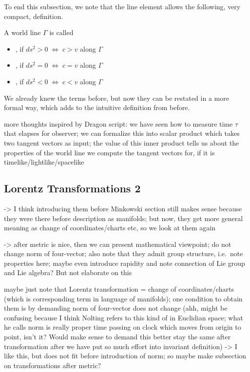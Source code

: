 To end this subsection, we note that the line element allows the following, very compact, definition.
\begin{defi}
A world line $\Gamma$ is called
\begin{itemize}
\item {}, if $ds^2> 0 \; \Leftrightarrow \; c > v$ along $\Gamma$


\item {}, if $ds^2 = 0 \; \Leftrightarrow \; c = v$ along $\Gamma$


\item {}, if $ds^2 < 0 \; \Leftrightarrow \; c < v$ along $\Gamma$
\end{itemize}
\end{defi}
We already knew the terms before, but now they can be restated in a more formal way, which adds to the intuitive definition from before.


more thoughts inspired by Dragon script: we have seen how to measure time $\tau$ that elapses for observer; we can formalize this into scalar product which takes two tangent vectors as input; the value of this inner product tells us about the properties of the world line we compute the tangent vectors for, if it is timelike/lightlike/spacelike






		\subsection{Lorentz Transformations 2}\label{subsec:lorentz_transformation_2}
-> I think introducing them before Minkowski section still makes sense because they were there before description as manifolds; but now, they get more general meaning as change of coordinates/charts etc, so we look at them again

-> after metric is nice, then we can present mathematical viewpoint; do not change norm of four-vector; also note that they admit group structure, i.e.~note properties here; maybe even introduce rapidity and note connection of Lie group and Lie algebra? But not elaborate on this

maybe just note that Lorentz transformation = change of coordinates/charts (which is corresponding term in language of manifolds); one condition to obtain them is by demanding norm of four-vector does not change (ahh, might be confusing because I think Nolting refers to this kind of in Euclidian space; what he calls norm is really proper time passing on clock which moves from origin to point, isn't it? Would make sense to demand this better stay the same after transformation after we have put so much effort into invariant definition) -> I like this, but does not fit before introduction of norm; so maybe make subsection on transformations after metric?



